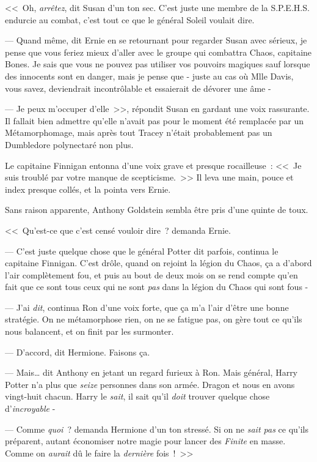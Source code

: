 <<~Oh, \emph{arrêtez}, dit Susan d'un ton sec. C'est juste une membre de la S.P.E.H.S. endurcie au combat, c'est tout ce que le général Soleil voulait dire.

--- Quand même, dit Ernie en se retournant pour regarder Susan avec sérieux, je pense que vous feriez mieux d'aller avec le groupe qui combattra Chaos, capitaine Bones. Je sais que vous ne pouvez pas utiliser vos pouvoirs magiques sauf lorsque des innocents sont en danger, mais je pense que - juste au cas où Mlle Davis, vous savez, deviendrait incontrôlable et essaierait de dévorer une âme -

--- Je peux m'occuper d'elle~>>, répondit Susan en gardant une voix rassurante. Il fallait bien admettre qu'elle n'avait pas pour le moment été remplacée par un Métamorphomage, mais après tout Tracey n'était probablement pas un Dumbledore polynectaré non plus.

Le capitaine Finnigan entonna d'une voix grave et presque rocailleuse~: <<~Je suis troublé par votre manque de scepticisme.~>> Il leva une main, pouce et index presque collés, et la pointa vers Ernie.

Sans raison apparente, Anthony Goldstein sembla être pris d'une quinte de toux.

<<~Qu'est-ce que c'est censé vouloir dire~? demanda Ernie.

--- C'est juste quelque chose que le général Potter dit parfois, continua le capitaine Finnigan. C'est drôle, quand on rejoint la légion du Chaos, ça a d'abord l'air complètement fou, et puis au bout de deux mois on se rend compte qu'en fait que ce sont tous ceux qui ne sont \emph{pas} dans la légion du Chaos qui sont fous -

--- J'ai \emph{dit}, continua Ron d'une voix forte, que ça m'a l'air d'être une bonne stratégie. On ne métamorphose rien, on ne se fatigue pas, on gère tout ce qu'ils nous balancent, et on finit par les surmonter.

--- D'accord, dit Hermione. Faisons ça.

--- Mais… dit Anthony en jetant un regard furieux à Ron. Mais général, Harry Potter n'a plus que \emph{seize} personnes dans son armée. Dragon et nous en avons vingt-huit chacun. Harry le \emph{sait}, il sait qu'il \emph{doit} trouver quelque chose d'\emph{incroyable} -

--- Comme \emph{quoi}~? demanda Hermione d'un ton stressé. Si on ne \emph{sait pas} ce qu'ils préparent, autant économiser notre magie pour lancer des \emph{Finite} en masse. Comme on \emph{aurait} dû le faire la \emph{dernière} fois~!~>>

